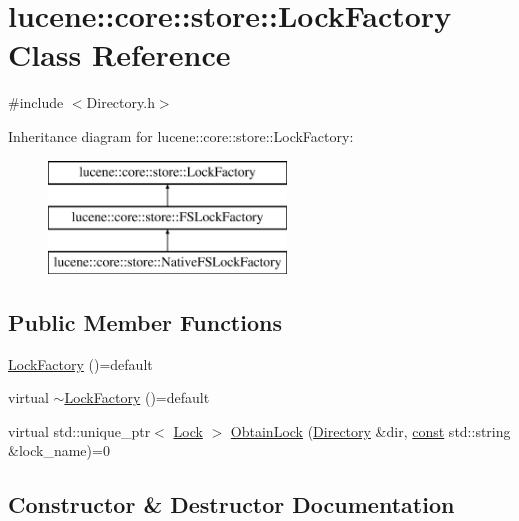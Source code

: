 \hypertarget{classlucene_1_1core_1_1store_1_1LockFactory}{}\section{lucene\+:\+:core\+:\+:store\+:\+:Lock\+Factory Class Reference}
\label{classlucene_1_1core_1_1store_1_1LockFactory}


{\ttfamily \#include $<$Directory.\+h$>$}

Inheritance diagram for lucene\+:\+:core\+:\+:store\+:\+:Lock\+Factory\+:\begin{figure}[H]
\begin{center}
\leavevmode
\includegraphics[height=3.000000cm]{classlucene_1_1core_1_1store_1_1LockFactory}
\end{center}
\end{figure}
\subsection*{Public Member Functions}
\begin{DoxyCompactItemize}
\item 
\mbox{\hyperlink{classlucene_1_1core_1_1store_1_1LockFactory_a5b83e26ce83405eff3ff0abca1980e49}{Lock\+Factory}} ()=default
\item 
virtual \mbox{\hyperlink{classlucene_1_1core_1_1store_1_1LockFactory_a4b81b04ffd8921a539028d5193121ee5}{$\sim$\+Lock\+Factory}} ()=default
\item 
virtual std\+::unique\+\_\+ptr$<$ \mbox{\hyperlink{classlucene_1_1core_1_1store_1_1Lock}{Lock}} $>$ \mbox{\hyperlink{classlucene_1_1core_1_1store_1_1LockFactory_a46f215414ef4714b6dc3298ddbd352f8}{Obtain\+Lock}} (\mbox{\hyperlink{classlucene_1_1core_1_1store_1_1Directory}{Directory}} \&dir, \mbox{\hyperlink{ZlibCrc32_8h_a2c212835823e3c54a8ab6d95c652660e}{const}} std\+::string \&lock\+\_\+name)=0
\end{DoxyCompactItemize}


\subsection{Constructor \& Destructor Documentation}
\mbox{\label{classlucene_1_1core_1_1store_1_1LockFactory_a5b83e26ce83405eff3ff0abca1980e49}} 
